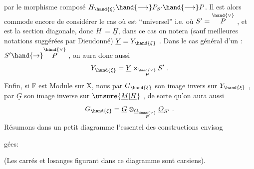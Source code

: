 
par le morphisme composé $H_{\hand{\xi}} \hand{\longrightarrow} P_{S'} \hand{\longrightarrow} P$. Il est alors commode
 encore de considérer le cas où \hand{$\xi$} est
``universel'' i.e. où $S' = \overset{\hand{\vee}}{P}$ , et \hand{$\xi$} est la section diagonale, donc $H \ = \underline{H}$,
dans ce cas on notera (sauf meilleures notations suggérées par Dieudonné)
$\underline{Y} = Y_{\hand{\xi}}$ . Dans le cas général d'un \hand{$\xi$}: $S' \hand{\to} \overset{\hand{\vee}}{P}$ , on aura donc aussi
\[ Y_{\hand{\xi}} = \underline{Y} \times_{\overset{\hand{\vee}}{P}} S' \ . \]
Enfin, si F est Module sur X, nous  par $G_{\hand{\xi}}$ son image invers
sur $Y_{\hand{\xi}}$ , par $\underline{G}$ son image inverse sur $\unsure{\underline{M}|\underline{H}}$ , de sorte qu'on aura aussi
\[ G_{\hand{\xi}} = \underline{G} \otimes_{\underline{O}_{\overset{\hand{\vee}}{P}}} \underline{O}_{S'} \ . \]
Résumons dans un petit diagramme l'essentel des constructions  envisag

gées:

(Les carrés et losanges figurant dans ce diagramme sont carsiens).

